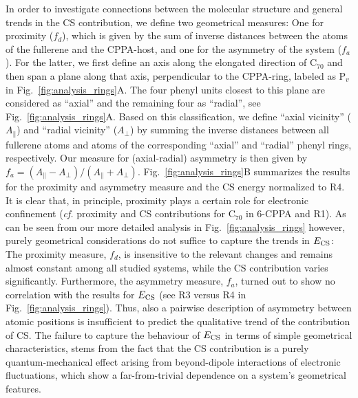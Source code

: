 \documentclass[aps,prl,groupaddress, twocolumn]{revtex4-1}  %
\begin{document}
In order to investigate connections between the molecular structure and general trends in the CS contribution, we define two geometrical measures:
One for proximity ($f_d$), which is given by the sum of inverse distances between the atoms of the fullerene and the CPPA-host, and one for the asymmetry of the system ($f_a$).
For the latter, we first define an axis along the elongated direction of C$_{70}$ and then span a plane along that axis, perpendicular to the CPPA-ring, labeled as P$_v$ in Fig.~\ref{fig:analysis_rings}A.
The four phenyl units closest to this plane are considered as ``axial'' and the remaining four as ``radial'', see Fig.~\ref{fig:analysis_rings}A.
Based on this classification, we define ``axial vicinity'' ($A_{\parallel}$) and ``radial vicinity'' ($A_{\perp}$) by summing the inverse distances between all fullerene atoms and atoms of the corresponding ``axial'' and ``radial'' phenyl rings, respectively.
Our measure for (axial-radial) asymmetry is then given by $f_a = (A_{\parallel} - A_{\perp})/(A_{\parallel} + A_{\perp})$. Fig.~\ref{fig:analysis_rings}B summarizes the results for the proximity and asymmetry measure and the CS energy normalized to R4.
It is clear that, in principle, proximity plays a certain role for electronic confinement (\textit{cf.} proximity and CS contributions for C$_{70}$ in 6-CPPA and R1). As can be seen from our more detailed analysis in Fig.~\ref{fig:analysis_rings} however, purely geometrical considerations do not suffice to capture the trends in $E_{\rm CS}$: The proximity measure, $f_d$, is insensitive to the relevant changes and remains almost constant among all studied systems, while the CS contribution varies significantly.
Furthermore, the asymmetry measure, $f_a$, turned out to show no correlation with the results for $E_{\rm CS}$ (see R3 versus R4 in Fig.~\ref{fig:analysis_rings}).
Thus, also a pairwise description of asymmetry between atomic positions is insufficient to predict the qualitative trend of the contribution of CS\@.
The failure to capture the behaviour of $E_{\rm CS}$ in terms of simple geometrical characteristics, stems from the fact that the CS contribution is a purely quantum-mechanical effect arising from beyond-dipole interactions of electronic fluctuations, which show a far-from-trivial dependence on a system's geometrical features.\\
\end{document}
